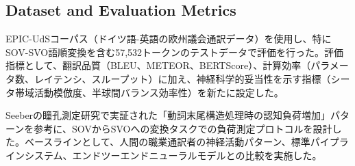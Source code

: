 \subsection{Dataset and Evaluation Metrics}

EPIC-UdSコーパス（ドイツ語-英語の欧州議会通訳データ）を使用し、特にSOV-SVO語順変換を含む57,532トークンのテストデータで評価を行った。評価指標として、翻訳品質（BLEU、METEOR、BERTScore）、計算効率（パラメータ数、レイテンシ、スループット）に加え、神経科学的妥当性を示す指標（シータ帯域活動模倣度、半球間バランス効率性）を新たに設定した。

Seeberの瞳孔測定研究で実証された「動詞末尾構造処理時の認知負荷増加」パターンを参考に、SOVからSVOへの変換タスクでの負荷測定プロトコルを設計した。ベースラインとして、人間の職業通訳者の神経活動パターン、標準パイプラインシステム、エンドツーエンドニューラルモデルとの比較を実施した。 